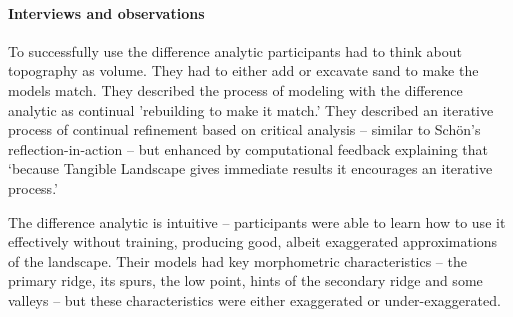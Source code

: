 \documentclass[prodmode,acmtochi]{acmsmall} %
\begin{document}
\paragraph{Interviews and observations}
To successfully use the difference analytic 
participants had to think about topography as volume.
They had to either add or excavate sand to make the models match. 
They described the process of modeling with the difference analytic
as continual 'rebuilding to make it match.'
They described an iterative process of 
continual refinement based on critical analysis 
-- similar to Sch{\"o}n's reflection-in-action \cite{Schon1983} --
but enhanced by computational feedback 
explaining that 
`because Tangible Landscape gives immediate results it encourages an iterative process.' 

The difference analytic is intuitive -- 
participants were able to learn how to use it effectively without training, 
producing good, albeit exaggerated approximations of the landscape. 
%
Their models had key morphometric characteristics -- 
the primary ridge, its spurs, the low point, 
hints of the secondary ridge and some valleys -- 
but these characteristics were either exaggerated or under-exaggerated.
\end{document}
